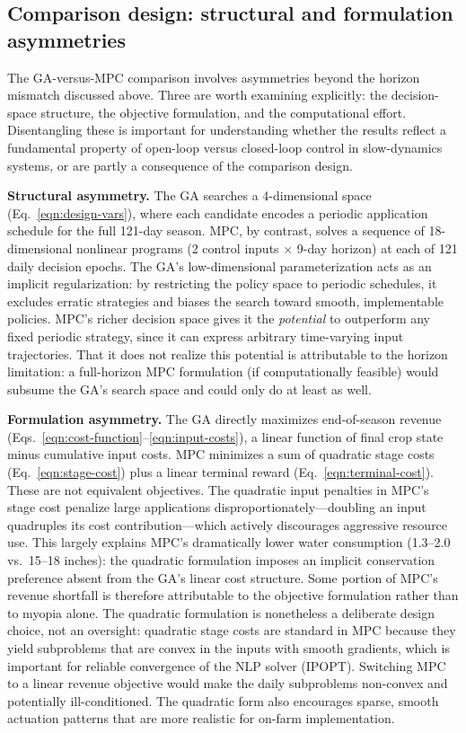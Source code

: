 \documentclass[pdflatex,sn-mathphys-num]{sn-jnl}
\begin{document}
\subsection{Comparison design: structural and formulation asymmetries}\label{subsec:asymmetries}

The GA-versus-MPC comparison involves asymmetries beyond the horizon mismatch discussed above. Three are worth examining explicitly: the decision-space structure, the objective formulation, and the computational effort. Disentangling these is important for understanding whether the results reflect a fundamental property of open-loop versus closed-loop control in slow-dynamics systems, or are partly a consequence of the comparison design.

\textbf{Structural asymmetry.} The GA searches a 4-dimensional space (Eq.~\ref{eqn:design-vars}), where each candidate encodes a periodic application schedule for the full 121-day season. MPC, by contrast, solves a sequence of 18-dimensional nonlinear programs (2 control inputs $\times$ 9-day horizon) at each of 121 daily decision epochs. The GA's low-dimensional parameterization acts as an implicit regularization: by restricting the policy space to periodic schedules, it excludes erratic strategies and biases the search toward smooth, implementable policies. MPC's richer decision space gives it the \emph{potential} to outperform any fixed periodic strategy, since it can express arbitrary time-varying input trajectories. That it does not realize this potential is attributable to the horizon limitation: a full-horizon MPC formulation (if computationally feasible) would subsume the GA's search space and could only do at least as well.

\textbf{Formulation asymmetry.} The GA directly maximizes end-of-season revenue (Eqs.~\ref{eqn:cost-function}--\ref{eqn:input-costs}), a linear function of final crop state minus cumulative input costs. MPC minimizes a sum of quadratic stage costs (Eq.~\ref{eqn:stage-cost}) plus a linear terminal reward (Eq.~\ref{eqn:terminal-cost}). These are not equivalent objectives. The quadratic input penalties in MPC's stage cost penalize large applications disproportionately---doubling an input quadruples its cost contribution---which actively discourages aggressive resource use. This largely explains MPC's dramatically lower water consumption (1.3--2.0 vs.\ 15--18 inches): the quadratic formulation imposes an implicit conservation preference absent from the GA's linear cost structure. Some portion of MPC's revenue shortfall is therefore attributable to the objective formulation rather than to myopia alone. The quadratic formulation is nonetheless a deliberate design choice, not an oversight: quadratic stage costs are standard in MPC because they yield subproblems that are convex in the inputs with smooth gradients, which is important for reliable convergence of the NLP solver (IPOPT). Switching MPC to a linear revenue objective would make the daily subproblems non-convex and potentially ill-conditioned. The quadratic form also encourages sparse, smooth actuation patterns that are more realistic for on-farm implementation.
\end{document}
